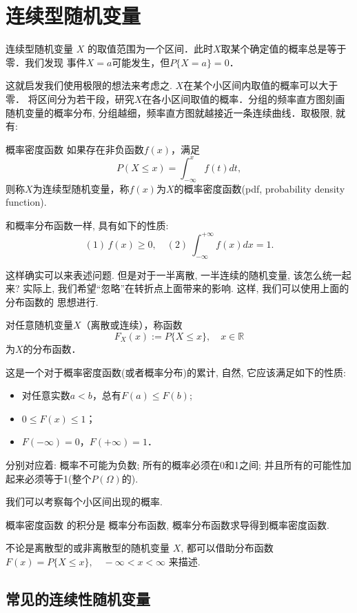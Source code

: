 \section{连续型随机变量}
连续型随机变量 $X$ 的取值范围为一个区间．此时$X$取某个确定值的概率总是等于零．我们发现
事件$X=a$可能发生，但$P\{X=a\}=0$．

这就启发我们使用极限的想法来考虑之. $X$在某个小区间内取值的概率可以大于零．
将区间分为若干段，研究$X$在各小区间取值的概率．分组的频率直方图刻画随机变量的概率分布,
分组越细，频率直方图就越接近一条连续曲线．取极限, 就有:

\begin{definition}{概率密度函数}
    如果存在非负函数$f(x)$，满足
    $$
        P(X\leq x)=\int_{-\infty}^{x}f(t)dt,
    $$
    则称$X$为连续型随机变量，称$f(x)$为$X$的概率密度函数(pdf, probability density function).
\end{definition}

和概率分布函数一样, 具有如下的性质:
    $$
    (1)\,f(x)\ge 0,\quad (2)\ \int_{-\infty}^{+\infty}f(x)dx=1.
$$

这样确实可以来表述问题. 但是对于一半离散, 一半连续的随机变量, 该怎么统一起来?
实际上, 我们希望``忽略''在转折点上面带来的影响. 这样, 我们可以使用上面的分布函数的
思想进行.

\begin{definition}
    对任意随机变量$X$（离散或连续），称函数
    $$F_X(x):=P\{X\le x\},\quad x\in \mathbb{R}$$
    为$X$的分布函数．
\end{definition}
这是一个对于概率密度函数(或者概率分布)的累计, 自然, 它应该满足如下的性质:

\begin{itemize}
    \item 对任意实数$a<b$，总有$F(a)\le F(b)$;
    \item $0 \le F(x) \le 1$；
    \item $F(-\infty)=0$，$F(+\infty)=1$．
\end{itemize}
分别对应着: 概率不可能为负数; 所有的概率必须在0和1之间; 并且所有的可能性加起来必须等于1(整个$P(\Omega)$的).
    \begin{takeaway}
        我们可以考察每个小区间出现的概率. 

    概率密度函数 的积分是 概率分布函数, 概率分布函数求导得到概率密度函数. 

    不论是离散型的或非离散型的随机变量 $X$, 都可以借助分布函数$F(x)=P\{X \leqslant x\}, \quad-\infty<x<\infty$
    来描述. 
    \end{takeaway}
\subsection{常见的连续性随机变量}

